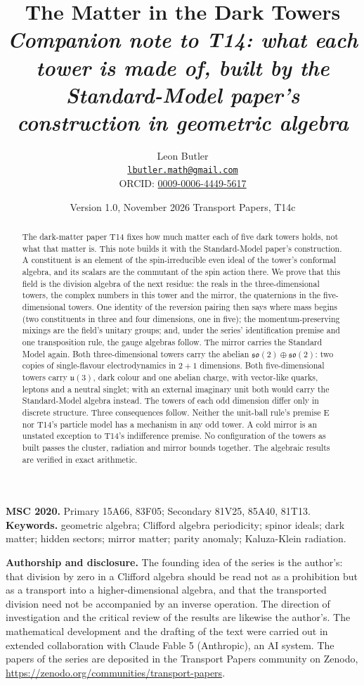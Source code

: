 \documentclass[11pt]{article}
\title{\bfseries The Matter in the Dark Towers\\[4pt]
  \large\itshape Companion note to T14: what each tower is made of, built by the Standard-Model paper's construction in geometric algebra}
\author{Leon Butler\\ \normalsize\href{mailto:lbutler.math@gmail.com}{\texttt{lbutler.math@gmail.com}}\\ \normalsize ORCID: \href{https://orcid.org/0009-0006-4449-5617}{0009-0006-4449-5617}}
\date{Version 1.0, November 2026 \textperiodcentered{} Transport Papers, T14c}
\theoremstyle{definition}
\newcommand{\so}{\mathfrak{so}}
\newcommand{\uu}{\mathfrak{u}}
\begin{document}
\maketitle

\begin{abstract}
\normalsize
The dark-matter paper T14 fixes how much matter each of five dark towers holds, not what that matter is. This note builds it with the Standard-Model paper's construction. A constituent is an element of the spin-irreducible even ideal of the tower's conformal algebra, and its scalars are the commutant of the spin action there. We prove that this field is the division algebra of the next residue: the reals in the three-dimensional towers, the complex numbers in this tower and the mirror, the quaternions in the five-dimensional towers. One identity of the reversion pairing then says where mass begins (two constituents in three and four dimensions, one in five); the momentum-preserving mixings are the field's unitary groups; and, under the series' identification premise and one transposition rule, the gauge algebras follow. The mirror carries the Standard Model again. Both three-dimensional towers carry the abelian $\so(2) \oplus \so(2)$: two copies of single-flavour electrodynamics in $2+1$ dimensions. Both five-dimensional towers carry $\uu(3)$, dark colour and one abelian charge, with vector-like quarks, leptons and a neutral singlet; with an external imaginary unit both would carry the Standard-Model algebra instead. The towers of each odd dimension differ only in discrete structure. Three consequences follow. Neither the unit-ball rule's premise E nor T14's particle model has a mechanism in any odd tower. A cold mirror is an unstated exception to T14's indifference premise. No configuration of the towers as built passes the cluster, radiation and mirror bounds together. The algebraic results are verified in exact arithmetic.
\end{abstract}

\medskip
\noindent\textbf{MSC 2020.} Primary 15A66, 83F05; Secondary 81V25, 85A40, 81T13.\\
\textbf{Keywords.} geometric algebra; Clifford algebra periodicity; spinor ideals; dark matter; hidden sectors; mirror matter; parity anomaly; Kaluza-Klein radiation.

\newpage
\textbf{Authorship and disclosure. }The founding idea of the series is the author's: that division by zero in a Clifford algebra should be read not as a prohibition but as a transport into a higher-dimensional algebra, and that the transported division need not be accompanied by an inverse operation. The direction of investigation and the critical review of the results are likewise the author's. The mathematical development and the drafting of the text were carried out in extended collaboration with Claude Fable 5 (Anthropic), an AI system. The papers of the series are deposited in the Transport Papers community on Zenodo, \url{https://zenodo.org/communities/transport-papers}.
\end{document}
